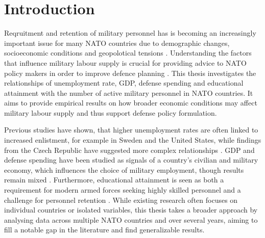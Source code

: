 \chapter{Introduction}

Reqruitment and retention of military personnel has is becoming an increasingly 
important issue for many NATO countries due to demographic changes, socioeconomic 
conditions and geopolotical tensions \parencite{nato_research_and_technology_organization_recruiting_2007,nato_nato_2022}.
Understanding the factors that influence military labour supply is crucial for providing 
advice to NATO policy makers in order to improve defence planning \parencite{nato_research_and_technology_organization_recruiting_2007}.
This thesis investigates the relationships of
unemployment rate, GDP, defense spending and educational attainment with
the number of active military personnel in NATO countries.
It aims to provide empirical results on how broader economic conditions 
may affect military labour supply and thus support defense policy formulation.

Previous studies have shown, that higher unemployment rates are often 
linked to increased enlistment, for example in Sweden and the United States, 
while findings from the Czech Republic have suggested more complex relationships
\parencite{backstrom_are_2019,asch_cash_2010,holcner_military_2021}. 
GDP and defense spending have been studied as signals of a country’s 
civilian and military economy, which influences the choice of military employment, 
though results remain mixed \parencite{warner_chapter_1995,holcner_military_2021}. 
Furthermore, educational attainment is seen as both a requirement for modern armed forces seeking highly skilled personnel 
and a challenge for personnel retention
\parencite{cnas_resources_and_force_readiness_division_fiscal_nodate,hof_quality_2023}. 
While existing research 
often focuses on individual countries or isolated variables, this thesis takes a 
broader approach by analysing data across multiple NATO countries and over several years, 
aiming to fill a notable gap in the literature and find generalizable results.
